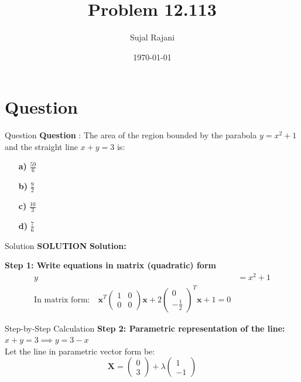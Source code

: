 \documentclass{beamer}
\title{Problem 12.113}
\author{Sujal Rajani}
\date{\today}
\let\vec\mathbf
\theoremstyle{remark}
\numberwithin{equation}{section}
\begin{document}
\begin{frame}
\titlepage
\end{frame}

\section{Question}
\begin{frame}{Question}
\textbf{Question }:
The area of the region bounded by the parabola \( y = x^2 + 1 \) and the straight line \( x + y = 3 \) is:
\\
\begin{enumerate}
    \item[\textbf{a)}] \( \frac{59}{6} \) 
    \\
    \item[\textbf{b)}] \( \frac{9}{2} \)
    \\
    \item[\textbf{c)}] \( \frac{10}{3} \)
    \\
    \item[\textbf{d)}] \( \frac{7}{6} \)
\end{enumerate}

\end{frame}
\begin{frame}{Solution}
\textbf{SOLUTION}
\textbf{Solution:}

\textbf{Step 1: Write equations in matrix (quadratic) form}
\begin{align*}
y &= x^2 + 1  \\
\text{In matrix form:} \quad \vec{x}^T 
\begin{pmatrix} 1 & 0 \\ 0 & 0 \end{pmatrix}
\vec{x} + 2
\begin{pmatrix} 0 \\ -\frac{1}{2} \end{pmatrix}^T
\vec{x} + 1 = 0
\end{align*}

     \end{frame}
     \begin{frame}{ Step-by-Step Calculation}    
\textbf{Step 2: Parametric representation of the line:} \\
\( x + y = 3 \implies y = 3 - x \) \\
Let the line in parametric vector form be:
\[
\vec{X} = \begin{pmatrix} 0 \\ 3 \end{pmatrix} + \lambda \begin{pmatrix} 1 \\ -1 \end{pmatrix}
\]

     \end{frame}
\end{document}

